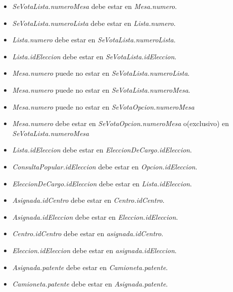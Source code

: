 \documentclass[10pt,a4paper]{article}
\begin{document}
\begin{itemize}
\item \textit{SeVotaLista.numeroMesa} debe estar en \textit{Mesa.numero}.

\item \textit{SeVotaLista.numeroLista} debe estar en \textit{Lista.numero}.

\item \textit{Lista.numero} debe estar en \textit{SeVotaLista.numeroLista}.

\item \textit{Lista.idEleccion} debe estar en \textit{SeVotaLista.idEleccion}.

\item \textit{Mesa.numero} puede no estar en \textit{SeVotaLista.numeroLista}.

\item \textit{Mesa.numero} puede no estar en \textit{SeVotaLista.numeroMesa}.

\item \textit{Mesa.numero} puede no estar en \textit{SeVotaOpcion.numeroMesa}

\item \textit{Mesa.numero} debe estar en \textit{SeVotaOpcion.numeroMesa} o(exclusivo) en \textit{SeVotaLista.numeroMesa}

\item \textit{Lista.idEleccion} debe estar en \textit{EleccionDeCargo.idEleccion}.

\item \textit{ConsultaPopular.idEleccion} debe estar en \textit{Opcion.idEleccion}.

\item \textit{EleccionDeCargo.idEleccion} debe estar en \textit{Lista.idEleccion}.

\item \textit{Asignada.idCentro} debe estar en \textit{Centro.idCentro}.

\item \textit{Asignada.idEleccion} debe estar en \textit{Eleccion.idEleccion}.

\item \textit{Centro.idCentro} debe estar en \textit{asignada.idCentro}.

\item \textit{Eleccion.idEleccion} debe estar en \textit{asignada.idEleccion}.

\item \textit{Asignada.patente} debe estar en \textit{Camioneta.patente}.

\item \textit{Camioneta.patente} debe estar en \textit{Asignada.patente}.


\end{itemize}
\end{document}
